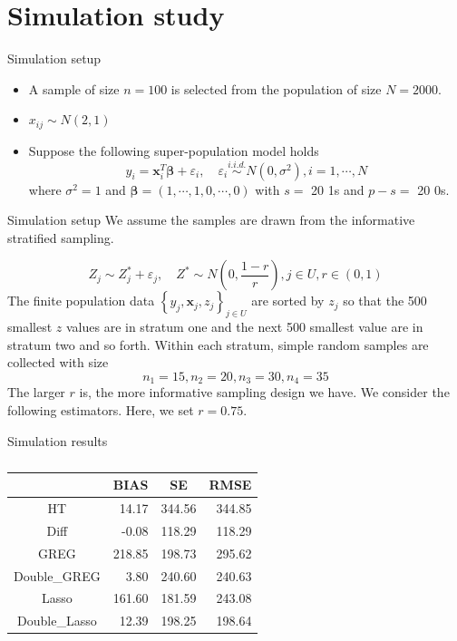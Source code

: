 \documentclass[usenames,dvipsnames, xcolor=table]{beamer}
\renewcommand{\bf}[1]{\boldsymbol{\mathbf{#1}}}
\newcommand{\set}[1]{\left\{#1\right\}} %
\newcommand{\pa}[1]{\left(#1\right)} %
\newcommand{\iid}{\stackrel{i.i.d.}{\sim}}
\begin{document}
\section{Simulation study}

\begin{frame}{Simulation setup}
    \begin{itemize}
        \item A sample of size $n = 100$ is selected from the population of size $N = 2000$.
        \item $x_{ij} \sim N(2, 1)$
        \item Suppose the following super-population model holds \[
y_i = \bf x_i^T \bf \beta + \varepsilon_i, \quad \varepsilon_i \iid N(0,\sigma^2), i = 1, \cdots, N
\] where \(\sigma^2 = 1\) and
\(\bf \beta = (1, \cdots, 1, 0, \cdots, 0)\) with \(s =\) 20 1s and
\(p - s =\) 20 0s.
    \end{itemize}
\end{frame}

\begin{frame}{Simulation setup}
     We assume the samples are drawn from the informative stratified sampling.

    $$
    Z_j \sim Z_j^* + \varepsilon_j, \quad Z^* \sim N\pa{0, \frac{1 - r}{r}}, j \in U, r \in (0, 1)
    $$
    The finite population data $\set{y_j, \bf x_j, z_j}_{j \in U}$ are sorted by $z_j$ so that the 500 smallest $z$ values are in stratum one and the next 500 smallest value are in stratum two and so forth. Within each stratum, simple random samples are collected with size
    $$
    n_1 = 15, n_2 = 20, n_3 = 30, n_4 = 35
    $$
    The larger $r$ is, the more informative sampling design we have. We consider the following estimators. Here, we set $r = 0.75$.
\end{frame}

\begin{frame}{Simulation results}
\begin{table}[]
\begin{tabular}{crrr}
\hline
              & \multicolumn{1}{c}{BIAS} & \multicolumn{1}{c}{SE} & \multicolumn{1}{c}{RMSE} \\ \hline
HT            & 14.17                    & 344.56                 & 344.85                   \\
Diff          & -0.08                    & 118.29                 & 118.29                   \\
GREG          & 218.85                   & 198.73                 & 295.62                   \\
Double\_GREG  & 3.80                     & 240.60                 & 240.63                   \\
Lasso         & 161.60                   & 181.59                 & 243.08                   \\
Double\_Lasso & 12.39                    & 198.25                 & 198.64                   \\ \hline
\end{tabular}
\caption{}
\label{tab:my-table}
\end{table}
\end{frame}
\end{document}
